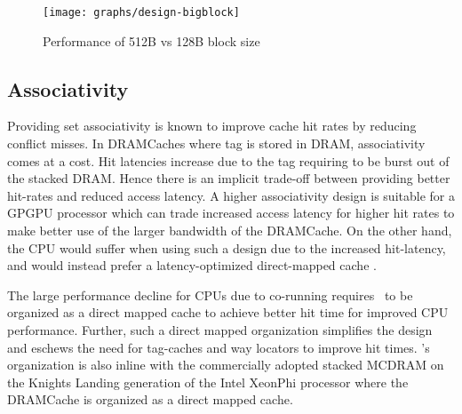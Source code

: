 \begin{figure}[htbp]
   \centering
   \texttt{[image: graphs/design-bigblock]}
   \caption{Performance of 512B vs 128B block size}	
   \label{fig:design-bigblock}
\end{figure}

\subsection{Associativity} 
Providing set associativity is known to improve cache hit rates by reducing conflict misses. In DRAMCaches where tag is stored in DRAM,  associativity comes at a cost. Hit latencies increase due to the tag requiring to be burst out of the stacked DRAM. Hence there is an implicit trade-off between providing better hit-rates and reduced access latency. A higher associativity design is suitable for a GPGPU processor which can trade increased access latency for higher hit rates to make better use of the larger bandwidth of the DRAMCache. On the other hand, the CPU would suffer when using such a design due to the increased hit-latency, and  would instead prefer a latency-optimized direct-mapped cache \cite{alloy}.
\par The large performance decline for CPUs due to co-running requires \cachename\ to be organized as a direct mapped cache to achieve better hit time for improved CPU performance. Further, such a direct mapped organization simplifies the design and eschews the need for tag-caches \cite{atcache} and way locators \cite{bimodal} to improve hit times. \cachename's organization is also inline with the commercially adopted stacked MCDRAM on the Knights Landing generation of the Intel XeonPhi processor \cite{xeonphi} where the DRAMCache is organized as a direct mapped cache.

